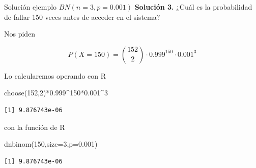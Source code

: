 \documentclass[
  ignorenonframetext,
  aspectratio=169]{beamer}
\newenvironment{Shaded}{\begin{snugshade}}{\end{snugshade}}
\newcommand{\AttributeTok}[1]{\textcolor[rgb]{0.40,0.45,0.13}{#1}}
\newcommand{\DecValTok}[1]{\textcolor[rgb]{0.68,0.00,0.00}{#1}}
\newcommand{\FloatTok}[1]{\textcolor[rgb]{0.68,0.00,0.00}{#1}}
\newcommand{\FunctionTok}[1]{\textcolor[rgb]{0.28,0.35,0.67}{#1}}
\newcommand{\NormalTok}[1]{\textcolor[rgb]{0.00,0.23,0.31}{#1}}
\newcommand{\SpecialCharTok}[1]{\textcolor[rgb]{0.37,0.37,0.37}{#1}}
\begin{document}
\begin{frame}[fragile]{Solución ejemplo \(BN(n=3,p=0.001)\)}
\protect\hypertarget{soluciuxf3n-ejemplo-bnn3p0.001}{}
\textbf{Solución 3.} ¿Cuál es la probabilidad de fallar 150 veces antes
de acceder en el sistema?

Nos piden

\[
P(X=150)= {152\choose 2} \cdot 0.999^{150}\cdot 0.001^3
\]

Lo calcularemos operando con R

\begin{Shaded}
\begin{Highlighting}[]
\FunctionTok{choose}\NormalTok{(}\DecValTok{152}\NormalTok{,}\DecValTok{2}\NormalTok{)}\SpecialCharTok{*}\FloatTok{0.999}\SpecialCharTok{\^{}}\DecValTok{150}\SpecialCharTok{*}\FloatTok{0.001}\SpecialCharTok{\^{}}\DecValTok{3}
\end{Highlighting}
\end{Shaded}

\begin{verbatim}
[1] 9.876743e-06
\end{verbatim}

con la función de R

\begin{Shaded}
\begin{Highlighting}[]
\FunctionTok{dnbinom}\NormalTok{(}\DecValTok{150}\NormalTok{,}\AttributeTok{size=}\DecValTok{3}\NormalTok{,}\AttributeTok{p=}\FloatTok{0.001}\NormalTok{)}
\end{Highlighting}
\end{Shaded}

\begin{verbatim}
[1] 9.876743e-06
\end{verbatim}
\end{frame}
\end{document}
